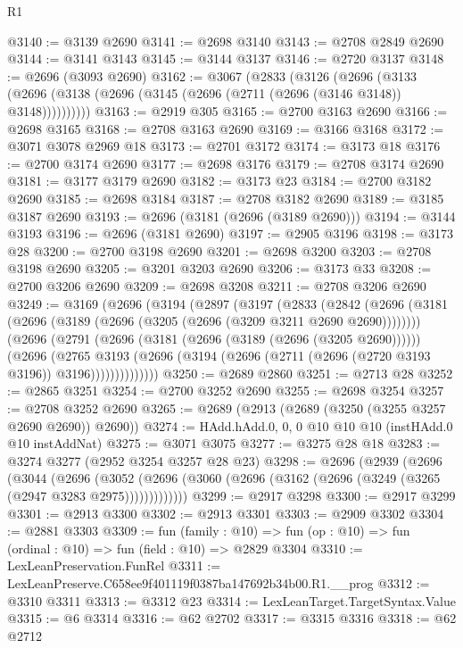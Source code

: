 \begin{lexlean}{R1}
\begin{coremodule}
@3140 := @3139 @2690
@3141 := @2698 @3140
@3143 := @2708 @2849 @2690
@3144 := @3141 @3143
@3145 := @3144 @3137
@3146 := @2720 @3137
@3148 := @2696 (@3093 @2690)
@3162 := @3067
    (@2833
      (@3126
        (@2696
          (@3133 (@2696 (@3138 (@2696 (@3145 (@2696 (@2711 (@2696 (@3146 @3148)) @3148))))))))))
@3163 := @2919 @305
@3165 := @2700 @3163 @2690
@3166 := @2698 @3165
@3168 := @2708 @3163 @2690
@3169 := @3166 @3168
@3172 := @3071 @3078 @2969 @18
@3173 := @2701 @3172
@3174 := @3173 @18
@3176 := @2700 @3174 @2690
@3177 := @2698 @3176
@3179 := @2708 @3174 @2690
@3181 := @3177 @3179 @2690
@3182 := @3173 @23
@3184 := @2700 @3182 @2690
@3185 := @2698 @3184
@3187 := @2708 @3182 @2690
@3189 := @3185 @3187 @2690
@3193 := @2696 (@3181 (@2696 (@3189 @2690)))
@3194 := @3144 @3193
@3196 := @2696 (@3181 @2690)
@3197 := @2905 @3196
@3198 := @3173 @28
@3200 := @2700 @3198 @2690
@3201 := @2698 @3200
@3203 := @2708 @3198 @2690
@3205 := @3201 @3203 @2690
@3206 := @3173 @33
@3208 := @2700 @3206 @2690
@3209 := @2698 @3208
@3211 := @2708 @3206 @2690
@3249 := @3169
    (@2696
      (@3194
        (@2897
          (@3197
            (@2833
              (@2842
                (@2696 (@3181 (@2696 (@3189 (@2696 (@3205 (@2696 (@3209 @3211 @2690 @2690))))))))
                (@2696
                  (@2791
                    (@2696 (@3181 (@2696 (@3189 (@2696 (@3205 @2690))))))
                    (@2696
                      (@2765
                        @3193
                        (@2696 (@3194 (@2696 (@2711 (@2696 (@2720 @3193 @3196)) @3196))))))))))))))
@3250 := @2689 @2860
@3251 := @2713 @28
@3252 := @2865 @3251
@3254 := @2700 @3252 @2690
@3255 := @2698 @3254
@3257 := @2708 @3252 @2690
@3265 := @2689 (@2913 (@2689 (@3250 (@3255 @3257 @2690 @2690)) @2690))
@3274 := HAdd.hAdd.{0, 0, 0} @10 @10 @10 (instHAdd.{0} @10 instAddNat)
@3275 := @3071 @3075
@3277 := @3275 @28 @18
@3283 := @3274 @3277 (@2952 @3254 @3257 @28 @23)
@3298 := @2696
    (@2939
      (@2696
        (@3044
          (@2696
            (@3052 (@2696 (@3060 (@2696 (@3162 (@2696 (@3249 (@3265 (@2947 @3283 @2975)))))))))))))
@3299 := @2917 @3298
@3300 := @2917 @3299
@3301 := @2913 @3300
@3302 := @2913 @3301
@3303 := @2909 @3302
@3304 := @2881 @3303
@3309 := fun (family : @10) =>
  fun (op : @10) => fun (ordinal : @10) => fun (field : @10) => @2829 @3304
@3310 := LexLeanPreservation.FunRel
@3311 := LexLeanPreserve.C658ee9f401119f0387ba147692b34b00.R1.__prog
@3312 := @3310 @3311
@3313 := @3312 @23
@3314 := LexLeanTarget.TargetSyntax.Value
@3315 := @6 @3314
@3316 := @62 @2702
@3317 := @3315 @3316
@3318 := @62 @2712

\end{coremodule}
\end{lexlean}
